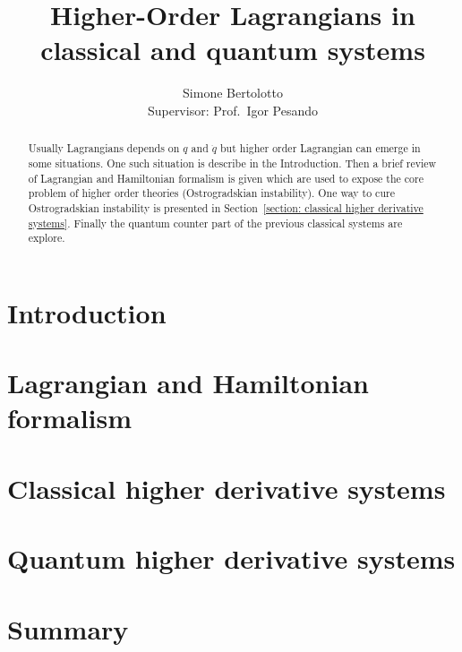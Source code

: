 \documentclass[a4paper]{article}
\title{Higher-Order Lagrangians in classical and quantum systems}
\author{Simone Bertolotto\\[1.0em]{\small Supervisor: Prof.\ Igor Pesando}}
\theoremstyle{definition}
\numberwithin{equation}{section}
\begin{document}
  \maketitle

  \begin{abstract}
    Usually Lagrangians depends on $q$ and $\dot{q}$ but higher order Lagrangian
    can emerge in some situations. One such situation is describe in the
    Introduction. Then a brief review of Lagrangian and Hamiltonian formalism
    is given which are used to expose the core problem of higher order
    theories (Ostrogradskian instability). One way to cure Ostrogradskian
    instability is presented in Section~\ref{section: classical higher
    derivative systems}. Finally the quantum counter part of the
    previous classical systems are explore.
  \end{abstract}

  \newpage

  \section{Introduction}\label{section: introduction}
  

  \section{Lagrangian and Hamiltonian formalism}\label{section: lagrangin and
  hamiltonian formalism}
  

  \section{Classical higher derivative systems}\label{section: classical higher
  derivative systems}
  

  \section{Quantum higher derivative systems}\label{section: quantum higher
  derivative systems}
  

  \section{Summary}\label{section: summary}
  

  \newpage
\end{document}
